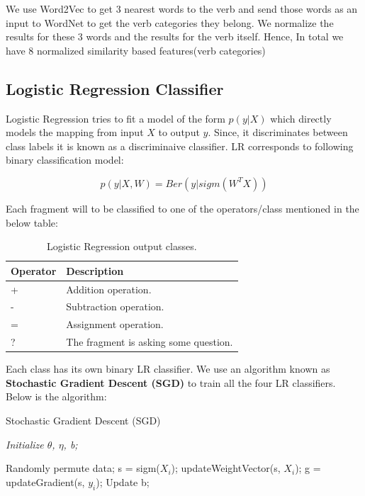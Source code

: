 \documentclass[11pt]{article}
\begin{document}
We use Word2Vec to get 3 nearest words to the verb and send those words as an input to WordNet to get the verb categories they belong. We normalize the results for these 3 words and the results for the verb itself. Hence, In total we have 8 normalized similarity based features(verb categories)

\subsection{Logistic Regression Classifier}

Logistic Regression tries to fit a model of the form \begin{math} p(y|X) \end{math} which directly models the mapping from input \begin{math}X\end{math} to output \begin{math}y\end{math}. Since, it discriminates between class labels it is known as a discriminaive classifier. LR corresponds to following binary classification model:

\begin{equation} p(y|X,W) = Ber(y|sigm(W^{T}X)) \end{equation}

Each fragment will to be classified to one of the operators/class mentioned in the below table:

\begin{table}[h!]
\centering
\begin{tabular}{ | m{5em} | m{20em} |}
\hline
 \textbf{Operator} & \textbf{Description}\\
\hline
+ & Addition operation. \\
\hline
- & Subtraction operation. \\
\hline
= & Assignment operation. \\
\hline
? & The fragment is asking some question.\\
\hline
\end{tabular}
\caption{Logistic Regression output classes.}
\label{table:19}
\end{table}

Each class has its own binary LR classifier. We use an algorithm known as \textbf{Stochastic Gradient Descent (SGD)} to train all the four LR classifiers. Below is the algorithm:

\begin{algorithm}
\caption{Stochastic Gradient Descent (SGD)}
\textit{Initialize $\theta$, $\eta$, b;}
\begin{algorithmic}
\Repeat 
\State Randomly permute data;
\State s = sigm($X_{i}$);
\State updateWeightVector(s, $X_{i}$);
\State g = updateGradient(s, $y_{i}$);
\State Update b;
\EndFor
\Until
\end{algorithmic}
\end{algorithm}
\end{document}
